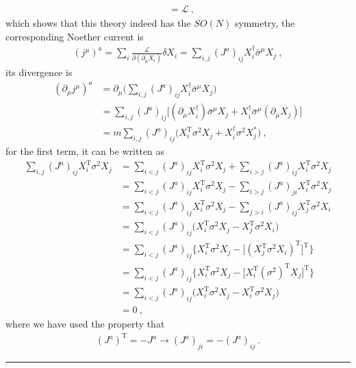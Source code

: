 \documentclass[12pt]{report}
\numberwithin{problemname}{chapter}
\newenvironment{solution}{\vspace{1em}\par\noindent{\large\textbf{\textsc{Solution}}}\par}{\vspace{1em}\hrule}
\begin{document}
\begin{solution}
\begin{enumerate}[(a)]
\begin{align}
        &=\mathcal{L}\ ,
    \end{align}
    which shows that this theory indeed has the $SO(N)$ symmetry, the corresponding Noether current is
    \begin{align}
        (j^{\mu})^a=\sum_i\frac{\mathcal{L}}{\partial(\partial_{\mu}X_i)}\delta X_i=\sum_{i,j}(J^a)_{ij}X_i^{\dagger}\bar{\sigma}^{\mu}X_j\ ,
    \end{align}
    its divergence is
    \begin{align}
        (\partial_{\mu}j^{\mu})^a&=\partial_{\mu}\bigg(\sum_{i,j}(J^a)_{ij}X_i^{\dagger}\bar{\sigma}^{\mu}X_j\bigg) \nonumber \\
        &=\sum_{i,j}(J^a)_{ij}\bigg[(\partial_{\mu}X_i^{\dagger})\bar{\sigma}^{\mu}X_j+X_i^{\dagger}\bar{\sigma}^{\mu}(\partial_{\mu}X_j)\bigg] \nonumber \\
        &=m\sum_{i,j}(J^a)_{ij}\bigg(X_i^{\text{T}}\sigma^2X_j+X_i^{\dagger}\sigma^2X_j^*\bigg) \ ,
    \end{align}
    for the first term, it can be written as
    \begin{align}
        \sum_{i,j}(J^a)_{ij}X_i^{\text{T}}\sigma^2X_j&=\sum_{i<j}(J^a)_{ij}X_i^{\text{T}}\sigma^2X_j+\sum_{i>j}(J^a)_{ij}X_i^{\text{T}}\sigma^2X_j \nonumber \\
        &=\sum_{i<j}(J^a)_{ij}X_i^{\text{T}}\sigma^2X_j-\sum_{i>j}(J^a)_{ji}X_i^{\text{T}}\sigma^2X_j \nonumber \\
        &=\sum_{i<j}(J^a)_{ij}X_i^{\text{T}}\sigma^2X_j-\sum_{j>i}(J^a)_{ij}X_j^{\text{T}}\sigma^2X_i \nonumber \\
        &=\sum_{i<j}(J^a)_{ij}\bigg(X_i^{\text{T}}\sigma^2X_j-X_j^{\text{T}}\sigma^2X_i\bigg) \nonumber \\
        &=\sum_{i<j}(J^a)_{ij}\bigg\{X_i^{\text{T}}\sigma^2X_j-\bigg[(X_j^{\text{T}}\sigma^2X_i)^{\text{T}}\bigg]^{\text{T}}\bigg\} \nonumber \\
        &=\sum_{i<j}(J^a)_{ij}\bigg\{X_i^{\text{T}}\sigma^2X_j-\bigg[X_i^{\text{T}}(\sigma^2)^{\text{T}}X_j\bigg]^{\text{T}}\bigg\} \nonumber \\
        &=\sum_{i<j}(J^a)_{ij}\bigg(X_i^{\text{T}}\sigma^2X_j-X_i^{\text{T}}\sigma^2X_j\bigg) \nonumber \\
        &=0\ ,
    \end{align}
    where we have used the property that 
    \begin{align}
        (J^a)^{\text{T}}=-J^a\to (J^a)_{ji}=-(J^a)_{ij}\ .
    \end{align}

\end{enumerate}
\end{solution}
\end{document}
